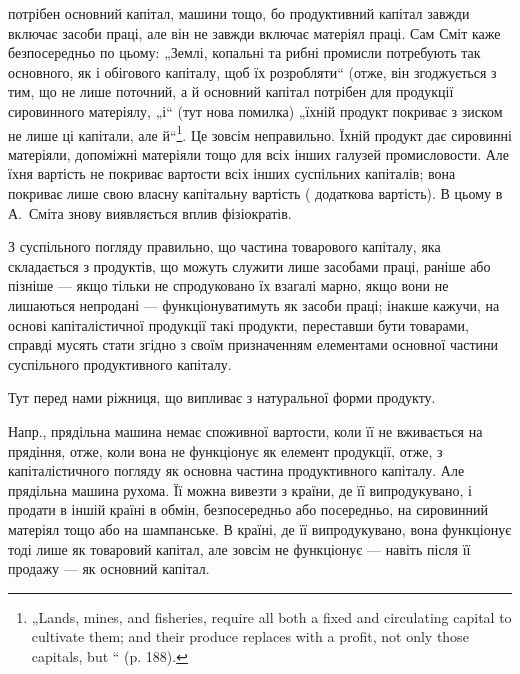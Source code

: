 \parcont{}  %
потрібен основний капітал, машини тощо, бо продуктивний капітал завжди
включає засоби праці, але він не завжди включає матеріял праці. Сам
Сміт каже безпосередньо по цьому: „Землі, копальні та рибні промисли
потребують так основного, як і обігового капіталу, щоб їх розробляти“
(отже, він згоджується з тим, що не лише поточний, а й основний капітал
потрібен для продукції сировинного матеріялу, „і“ (тут нова помилка)
„їхній продукт покриває з зиском не лише ці капітали, але й“\footnote*{
„Lands, mines, and fisheries, require all both a fixed and circulating capital
to cultivate them; and their produce replaces with a profit, not only those capitals,
but “ (p. 188).
}. Це зовсім неправильно. Їхній продукт
дає сировинні матеріяли, допоміжні матеріяли тощо для всіх інших галузей
промисловости. Але їхня вартість не покриває вартости всіх інших
суспільних капіталів; вона покриває лише свою власну капітальну вартість
(\dplus{} додаткова вартість). В цьому в А.~Сміта знову виявляється
вплив фізіократів.

З суспільного погляду правильно, що частина товарового капіталу,
яка складається з продуктів, що можуть служити лише засобами праці,
раніше або пізніше — якщо тільки не спродуковано їх взагалі марно,
якщо вони не лишаються непродані — функціонуватимуть як засоби праці;
інакше кажучи, на основі капіталістичної продукції такі продукти,
переставши бути товарами, справді мусять стати згідно з своїм призначенням
елементами основної частини суспільного продуктивного капіталу.

Тут перед нами ріжниця, що випливає з натуральної форми продукту.

Напр., прядільна машина немає споживної вартости, коли її не вживається
на прядіння, отже, коли вона не функціонує як елемент продукції,
отже, з капіталістичного погляду як основна частина продуктивного
капіталу. Але прядільна машина рухома. Її можна вивезти з країни, де
її випродукувано, і продати в іншій країні в обмін, безпосередньо або
посередньо, на сировинний матеріял тощо або на шампанське. В країні,
де її випродукувано, вона функціонує тоді лише як товаровий капітал,
але зовсім не функціонує — навіть після її продажу — як основний капітал.

